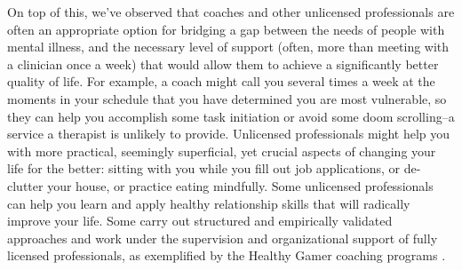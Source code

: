 \documentclass[12pt,letterpaper]{book}
\begin{document}
On top of this, we've observed that coaches and other unlicensed professionals are often an appropriate option for bridging a gap between the needs of people with mental illness, and the necessary level of support (often, more than meeting with a clinician once a week) that would allow them to achieve a significantly better quality of life. For example, a coach might call you several times a week at the moments in your schedule that you have determined you are most vulnerable, so they can help you accomplish some task initiation or avoid some doom scrolling–a service a therapist is unlikely to provide. Unlicensed professionals might help you with more practical, seemingly superficial, yet crucial aspects of changing your life for the better: sitting with you while you fill out job applications, or de-clutter your house, or practice eating mindfully. Some unlicensed professionals can help you learn and apply healthy relationship skills that will radically improve your life. Some carry out structured and empirically validated approaches and work under the supervision and organizational support of fully licensed professionals, as exemplified by the Healthy Gamer coaching programs \cite{healthyGamerMethodology}.
\end{document}
